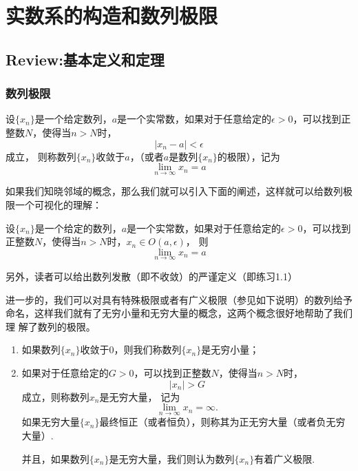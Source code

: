\chapter{实数系的构造和数列极限}

	\section{Review:基本定义和定理}
	\subsection{数列极限}
	\begin{definition}[数列极限的定义]
		设$\{x_n\}$是一个给定数列，$a$是一个实常数，如果对于任意给定的$\epsilon>0$，可以找到正整数$N$，使得当$n>N$时，$$|x_n-a|<\epsilon$$成立，
		则称数列$\{x_n\}$收敛于$a$，（或者$a$是数列$\{x_n\}$的极限），记为$$\lim\limits_{n\rightarrow\infty}x_n=a$$
	\end{definition}

	如果我们知晓邻域的概念，那么我们就可以引入下面的阐述，这样就可以给数列极限一个可视化的理解：
	\begin{definition}[数列极限的几何阐述]
		设$\{x_n\}$是一个给定的数列，$a$是一个实常数，如果对于任意给定的$\epsilon>0$，可以找到正整数$N$，使得当$n>N$时，$x_n\in O(a,\epsilon)$，
		则$$\lim\limits_{n\rightarrow\infty}x_n=a$$
	\end{definition}

	另外，读者可以给出数列发散（即不收敛）的严谨定义（即练习1.1）\par
	进一步的，我们可以对具有特殊极限或者有广义极限（参见如下说明）的数列给予命名，这样我们就有了无穷小量和无穷大量的概念，这两个概念很好地帮助了我们理
	解了数列的极限。
	\begin{definition}[无穷大量和无穷小量]
		\begin{enumerate}
			\item 如果数列$\{x_n\}$收敛于$0$，则我们称数列$\{x_n\}$是无穷小量；
			\item 如果对于任意给定的$G>0$，可以找到正整数$N$，使得当$n>N$时，$$|x_n|>G$$成立，则称数列${x_n}$是无穷大量，
			记为$$\lim\limits_{n\rightarrow\infty}x_n=\infty.$$
			如果无穷大量$\{x_n\}$最终恒正（或者恒负），则称其为正无穷大量（或者负无穷大量）.\par
			并且，如果数列$\{x_n\}$是无穷大量，我们则认为数列$\{x_n\}$有着广义极限.
		\end{enumerate}
	\end{definition}
	
